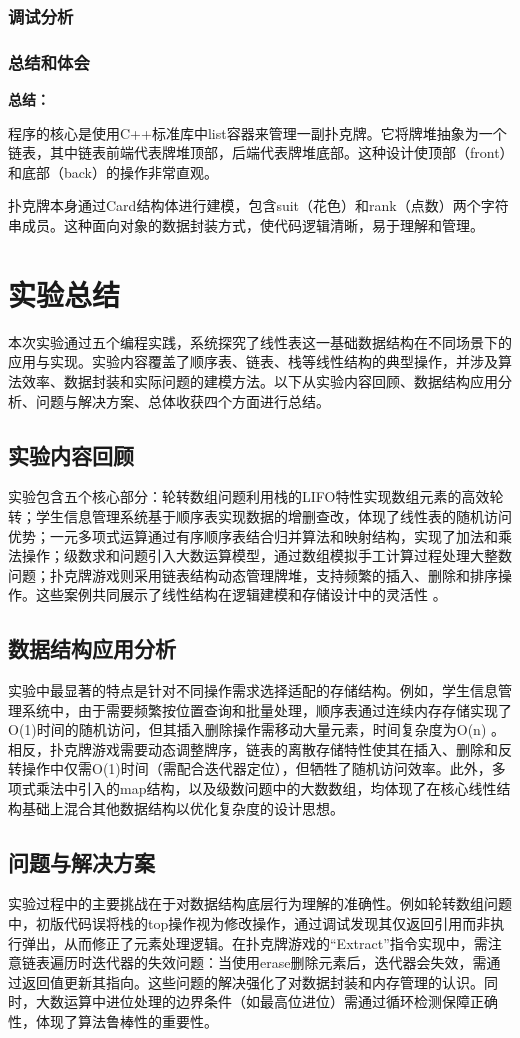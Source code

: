 \documentclass{article}
\begin{document}
\subsubsection{调试分析}
\subsubsection{总结和体会}
\textbf{总结：}\par 
程序的核心是使用C++标准库中list容器来管理一副扑克牌。它将牌堆抽象为一个链表，其中链表前端代表牌堆顶部，后端代表牌堆底部。这种设计使顶部（front）和底部（back）的操作非常直观。\par
扑克牌本身通过Card结构体进行建模，包含suit（花色）和rank（点数）两个字符串成员。这种面向对象的数据封装方式，使代码逻辑清晰，易于理解和管理。

\section{实验总结}
本次实验通过五个编程实践，系统探究了线性表这一基础数据结构在不同场景下的应用与实现。实验内容覆盖了顺序表、链表、栈等线性结构的典型操作，并涉及算法效率、数据封装和实际问题的建模方法。以下从实验内容回顾、数据结构应用分析、问题与解决方案、总体收获四个方面进行总结。
\subsection{实验内容回顾}
实验包含五个核心部分：轮转数组问题利用栈的LIFO特性实现数组元素的高效轮转；学生信息管理系统基于顺序表实现数据的增删查改，体现了线性表的随机访问优势；一元多项式运算通过有序顺序表结合归并算法和映射结构，实现了加法和乘法操作；级数求和问题引入大数运算模型，通过数组模拟手工计算过程处理大整数问题；扑克牌游戏则采用链表结构动态管理牌堆，支持频繁的插入、删除和排序操作。这些案例共同展示了线性结构在逻辑建模和存储设计中的灵活性
。
\subsection{数据结构应用分析}
实验中最显著的特点是针对不同操作需求选择适配的存储结构。例如，学生信息管理系统中，由于需要频繁按位置查询和批量处理，顺序表通过连续内存存储实现了O(1)时间的随机访问，但其插入删除操作需移动大量元素，时间复杂度为O(n)
。相反，扑克牌游戏需要动态调整牌序，链表的离散存储特性使其在插入、删除和反转操作中仅需O(1)时间（需配合迭代器定位），但牺牲了随机访问效率。此外，多项式乘法中引入的map结构，以及级数问题中的大数数组，均体现了在核心线性结构基础上混合其他数据结构以优化复杂度的设计思想。
\subsection{问题与解决方案}
实验过程中的主要挑战在于对数据结构底层行为理解的准确性。例如轮转数组问题中，初版代码误将栈的top操作视为修改操作，通过调试发现其仅返回引用而非执行弹出，从而修正了元素处理逻辑。在扑克牌游戏的“Extract”指令实现中，需注意链表遍历时迭代器的失效问题：当使用erase删除元素后，迭代器会失效，需通过返回值更新其指向。这些问题的解决强化了对数据封装和内存管理的认识。同时，大数运算中进位处理的边界条件（如最高位进位）需通过循环检测保障正确性，体现了算法鲁棒性的重要性。
\end{document}
